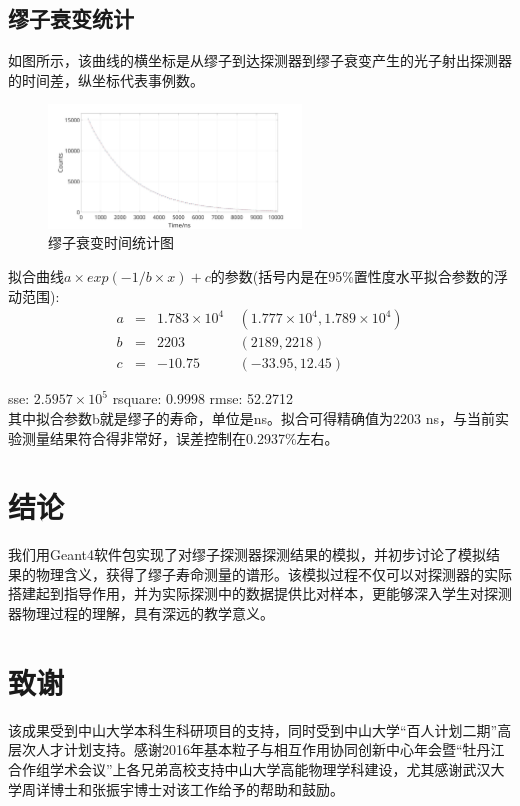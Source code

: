 \documentclass[aps,prd,superscriptaddress,nofootinbib,preprint]{ctexart}
\begin{document}
\begin{CJK}{UTF8}{gbsn}
\subsection{缪子衰变统计}

如图所示，该曲线的横坐标是从缪子到达探测器到缪子衰变产生的光子射出探测器的时间差，纵坐标代表事例数。\\

\begin{figure}[H]
\centering
    \includegraphics[width=0.6\textwidth]{pic/counts.jpg}
    \caption{缪子衰变时间统计图}
\end{figure}

拟合曲线$ a\times exp(-1/b\times x)+c$的参数(括号内是在95\%置性度水平拟合参数的浮动范围):
\begin{align}
      a & = & 1.783\times 10^4 & ~(1.777\times 10^4, 1.789\times 10^4)\\
       b & =  &    2203 & ~(2189, 2218)\\
       c & =  & -10.75 & ~(-33.95, 12.45)
\end{align}

sse: $2.5957\times 10^5$ rsquare: 0.9998  rmse: 52.2712\\
其中拟合参数b就是缪子的寿命，单位是ns。拟合可得精确值为2203 ns，与当前实验测量结果符合得非常好，误差控制在0.2937\%左右。

\section{结论}
我们用Geant4软件包实现了对缪子探测器探测结果的模拟，并初步讨论了模拟结果的物理含义，获得了缪子寿命测量的谱形。该模拟过程不仅可以对探测器的实际搭建起到指导作用，并为实际探测中的数据提供比对样本，更能够深入学生对探测器物理过程的理解，具有深远的教学意义。

\section{致谢}
该成果受到中山大学本科生科研项目的支持，同时受到中山大学“百人计划二期”高层次人才计划支持。感谢2016年基本粒子与相互作用协同创新中心年会暨``牡丹江合作组学术会议''上各兄弟高校支持中山大学高能物理学科建设，尤其感谢武汉大学周详博士和张振宇博士对该工作给予的帮助和鼓励。


\end{CJK}
\end{document}
